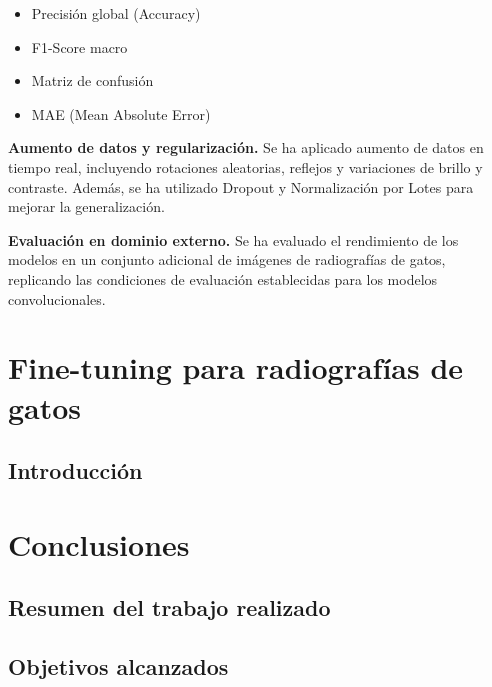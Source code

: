 \documentclass[11pt,spanish,listoffigures,listoftables]{tfgetsinf}
\begin{document}
\begin{itemize}
\item Precisión global (Accuracy)
\item F1-Score macro
\item Matriz de confusión
\item MAE (Mean Absolute Error)
\end{itemize}

\textbf{Aumento de datos y regularización.}
Se ha aplicado aumento de datos en tiempo real, incluyendo rotaciones aleatorias, reflejos y variaciones de brillo y contraste. Además, se ha utilizado Dropout y 
Normalización por Lotes para mejorar la generalización.

\textbf{Evaluación en dominio externo.}
Se ha evaluado el rendimiento de los modelos en un conjunto adicional de imágenes de radiografías de gatos, replicando las condiciones de evaluación establecidas 
para los modelos convolucionales.


\chapter{Fine-tuning para radiografías de gatos}
\label{chap:finetuning_cats}

\section{Introducción}
\label{sec:cat_intro}


\chapter{Conclusiones}  %

\section{Resumen del trabajo realizado} %

\section{Objetivos alcanzados}         %
\end{document}
